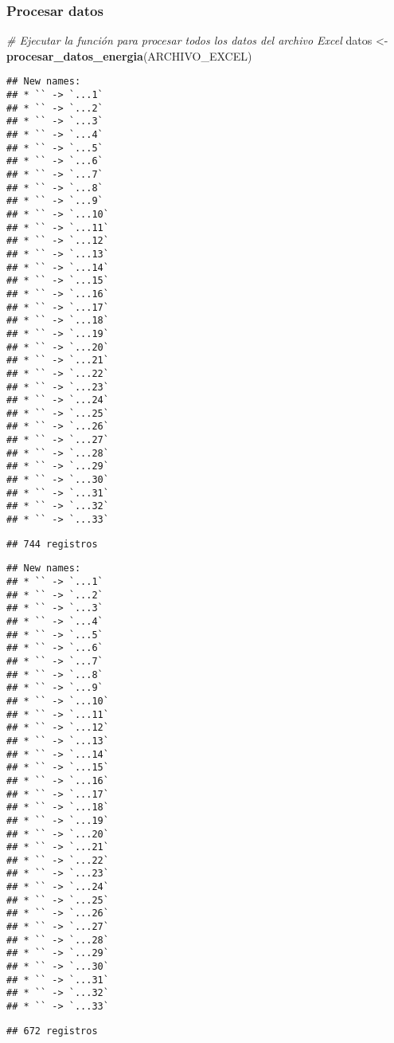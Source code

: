 \documentclass[
]{article}
\newenvironment{Shaded}{\begin{snugshade}}{\end{snugshade}}
\newcommand{\CommentTok}[1]{\textcolor[rgb]{0.56,0.35,0.01}{\textit{#1}}}
\newcommand{\FunctionTok}[1]{\textcolor[rgb]{0.13,0.29,0.53}{\textbf{#1}}}
\newcommand{\NormalTok}[1]{#1}
\newcommand{\OtherTok}[1]{\textcolor[rgb]{0.56,0.35,0.01}{#1}}
\begin{document}
\subsubsection{Procesar datos}\label{procesar-datos}

\begin{Shaded}
\begin{Highlighting}[]
\CommentTok{\# Ejecutar la función para procesar todos los datos del archivo Excel}
\NormalTok{datos }\OtherTok{\textless{}{-}} \FunctionTok{procesar\_datos\_energia}\NormalTok{(ARCHIVO\_EXCEL)}
\end{Highlighting}
\end{Shaded}

\begin{verbatim}
## New names:
## * `` -> `...1`
## * `` -> `...2`
## * `` -> `...3`
## * `` -> `...4`
## * `` -> `...5`
## * `` -> `...6`
## * `` -> `...7`
## * `` -> `...8`
## * `` -> `...9`
## * `` -> `...10`
## * `` -> `...11`
## * `` -> `...12`
## * `` -> `...13`
## * `` -> `...14`
## * `` -> `...15`
## * `` -> `...16`
## * `` -> `...17`
## * `` -> `...18`
## * `` -> `...19`
## * `` -> `...20`
## * `` -> `...21`
## * `` -> `...22`
## * `` -> `...23`
## * `` -> `...24`
## * `` -> `...25`
## * `` -> `...26`
## * `` -> `...27`
## * `` -> `...28`
## * `` -> `...29`
## * `` -> `...30`
## * `` -> `...31`
## * `` -> `...32`
## * `` -> `...33`
\end{verbatim}

\begin{verbatim}
## 744 registros
\end{verbatim}

\begin{verbatim}
## New names:
## * `` -> `...1`
## * `` -> `...2`
## * `` -> `...3`
## * `` -> `...4`
## * `` -> `...5`
## * `` -> `...6`
## * `` -> `...7`
## * `` -> `...8`
## * `` -> `...9`
## * `` -> `...10`
## * `` -> `...11`
## * `` -> `...12`
## * `` -> `...13`
## * `` -> `...14`
## * `` -> `...15`
## * `` -> `...16`
## * `` -> `...17`
## * `` -> `...18`
## * `` -> `...19`
## * `` -> `...20`
## * `` -> `...21`
## * `` -> `...22`
## * `` -> `...23`
## * `` -> `...24`
## * `` -> `...25`
## * `` -> `...26`
## * `` -> `...27`
## * `` -> `...28`
## * `` -> `...29`
## * `` -> `...30`
## * `` -> `...31`
## * `` -> `...32`
## * `` -> `...33`
\end{verbatim}

\begin{verbatim}
## 672 registros
\end{verbatim}
\end{document}
